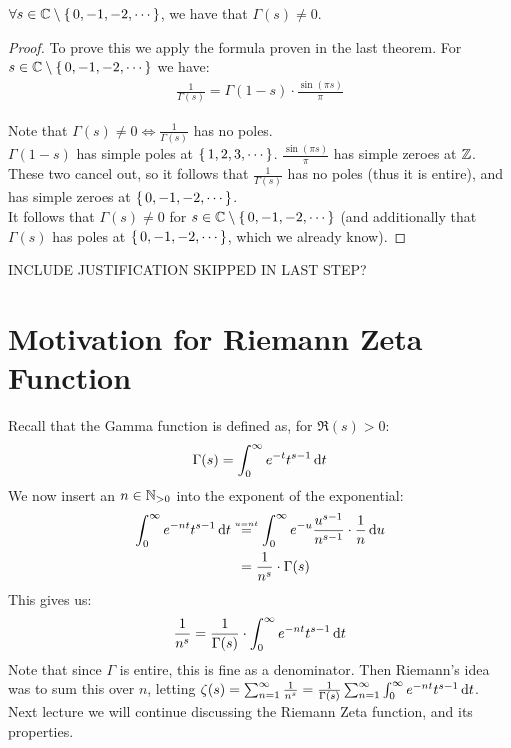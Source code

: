 \begin{corollary}
$\forall s \in \mathbb{C} \setminus \set{0,-1,-2,\cdots}$, we have that $\Gamma(s) \neq 0$.
\end{corollary}

\begin{proof}
To prove this we apply the formula proven in the last theorem. For $s \in \mathbb{C} \setminus \set{0,-1,-2,\cdots}$ we have:
\begin{align*}
    \frac{1}{\Gamma(s)} = \Gamma(1-s) \cdot \frac{\sin(\pi s)}{\pi}
\end{align*}

Note that $\Gamma(s) \neq 0 \Leftrightarrow \tfrac{1}{\Gamma(s)}$ has no poles.\\

$\Gamma(1-s)$ has simple poles at $\set{1,2,3, \cdots}$. $\frac{\sin(\pi s)}{\pi}$ has simple zeroes at $\mathbb{Z}$. These two cancel out, so it follows that $\frac{1}{\Gamma(s)}$ has no poles (thus it is entire), and has simple zeroes at $\set{0,-1,-2,\cdots}$.\\

It follows that $\Gamma(s) \neq 0$ for $s \in \mathbb{C} \setminus \set{0,-1,-2,\cdots}$ (and additionally that $\Gamma(s) $ has poles at $\set{0,-1,-2, \cdots}$, which we already know).
\end{proof}

INCLUDE JUSTIFICATION SKIPPED IN LAST STEP?



\section{Motivation for Riemann Zeta Function}

Recall that the Gamma function is defined as, for $\Re(s) >0$:
\begin{align*}
    \Gamma(s) = \int_0^\infty e^{-t} t^{s-1} \dif t
\end{align*}
We now insert an $n \in \mathbb{N}_{>0}$ into the exponent of the exponential:
\begin{align*}
    \int_0^\infty e^{-nt} t^{s-1} \dif t &\overset{{\scriptscriptstyle u = nt}}{=} \int_0^\infty e^{-u} \frac{u^{s-1}}{n^{s-1}} \cdot \frac{1}{n} \dif u\\
    & \, \; = \frac{1}{n^s} \cdot \Gamma(s)
\end{align*}
This gives us:
\begin{align*}
    \frac{1}{n^s} = \frac{1}{\Gamma(s) } \cdot \int_0^\infty e^{-nt} t^{s-1} \dif t
\end{align*}
Note that since $\Gamma$ is entire, this is fine as a denominator. Then Riemann's idea was to sum this over $n$, letting $\zeta(s) = \sum_{n=1}^\infty \frac{1}{n^s} = \frac{1}{\Gamma(s)} \sum_{n=1}^\infty \int_0^\infty e^{-nt} t^{s-1} \dif t$.\\

Next lecture we will continue discussing the Riemann Zeta function, and its properties.

